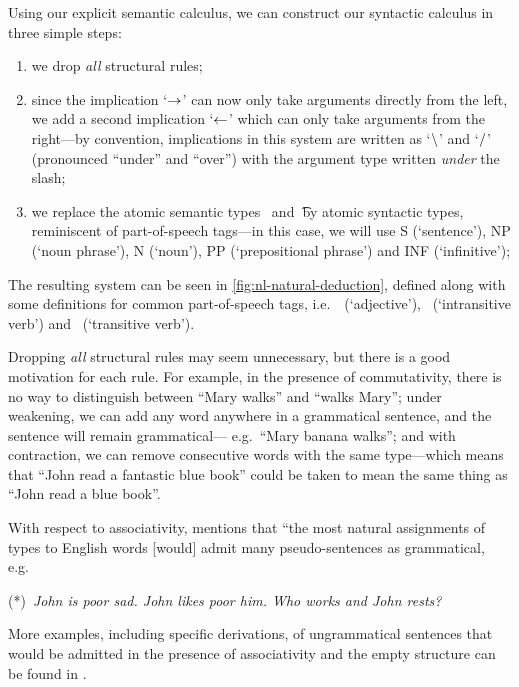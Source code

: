Using our explicit semantic calculus, we can construct our syntactic
calculus in three simple steps:
\begin{enumerate}
\item%
  we drop \emph{all} structural rules;
\item%
  since the implication `$\rightarrow$' can now only take arguments directly
  from the left, we add a second implication `$\leftarrow$' which can only
  take arguments from the right---by convention, implications in this
  system are written as `$\mathbin{\backslash}$' and `$\mathbin{\slash}$' (pronounced ``under''
  and ``over'') with the argument type written \emph{under} the slash;
\item%
  we replace the atomic semantic types \e\ and \t\ by atomic syntactic
  types, reminiscent of part-of-speech tags---in this case, we will
  use S (`sentence'), NP (`noun phrase'), N (`noun'), PP
  (`prepositional phrase') and INF (`infinitive');
\end{enumerate}
The resulting system can be seen in \autoref{fig:nl-natural-deduction},
defined along with some definitions for common part-of-speech tags,
i.e.\ \A\ (`adjective'), \IV\ (`intransitive verb') and \TV\
(`transitive verb').



Dropping \emph{all} structural rules may seem unnecessary, but there
is a good motivation for each rule.  For example, in the presence of
commutativity, there is no way to distinguish between ``Mary walks''
and ``walks Mary''; under weakening, we can add any word anywhere in a
grammatical sentence, and the sentence will remain grammatical---
e.g.\ ``Mary banana walks''; and with contraction, we can remove
consecutive words with the same type---which means that ``John read
a fantastic blue book'' could be taken to mean the same thing as
``John read a blue book''.

With respect to associativity, \citet[][p.\ 167]{lambek1961} mentions
that ``the most natural assignments of types to English words [would]
admit many pseudo-sentences as grammatical, e.g.\ %
\begin{center}
  (*)~\itshape John is poor sad. John likes poor him. Who works and
  John rests?
\end{center}
More examples, including specific derivations, of ungrammatical
sentences that would be admitted in the presence of associativity and
the empty structure can be found in \citet[p.\ 33, 105-106]{moot2012}.

